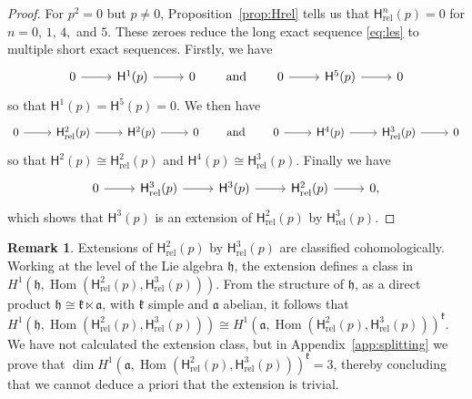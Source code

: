 \documentclass[11pt,reqno,a4paper,final]{amsart}
\theoremstyle{plain}
\theoremstyle{definition}
\newtheorem*{remark}{Remark}
\newcommand{\h}{\mathfrak{h}}
\newcommand{\fa}{\mathfrak{a}}
\newcommand{\fk}{\mathfrak{k}}
\newcommand{\sH}{\mathsf{H}}
\newcommand{\Hrel}{\mathsf{H}_{\mathrm{rel}}}
\newcommand{\1}{\mathbb{1}}
\newcommand{\Hom}{\operatorname{Hom}}
\numberwithin{equation}{section}
\begin{document}
\begin{proof}
  For $p^2 = 0$ but $p \neq 0$, Proposition~\ref{prop:Hrel} tells us
  that $\Hrel^n(p) = 0$ for $n = 0,\,1,\,4,$ and $5$. These zeroes
  reduce the long exact sequence \eqref{eq:les} to multiple short
  exact sequences. Firstly, we have
  \begin{equation}
    \begin{tikzcd}
      0 \arrow[r] & \sH^1(p) \arrow[r] & 0
    \end{tikzcd}
    \qquad\text{and}\qquad
    \begin{tikzcd}
      0 \arrow[r] & \sH^5(p) \arrow[r] & 0
    \end{tikzcd}
  \end{equation}
  so that $\sH^1(p) = \sH^5(p) = 0$.  We then have
  \begin{equation}
    \begin{tikzcd}
      0 \arrow[r] & \Hrel^2(p) \arrow[r] & \sH^2(p) \arrow[r] & 0 
    \end{tikzcd}
    \qquad\text{and}\qquad
    \begin{tikzcd}
      0 \arrow[r] & \sH^4(p) \arrow[r] & \Hrel^3(p) \arrow[r] & 0 
    \end{tikzcd}
  \end{equation}
  so that $\sH^2(p) \cong \Hrel^2(p)$  and $\sH^4(p) \cong \Hrel^3(p)$.
  Finally we have
  \begin{equation} \label{eq:Hrel3-H3-Hrel2-SES}
    \begin{tikzcd}
      0 \arrow[r] & \Hrel^3(p) \arrow[r] & \sH^3(p) \arrow[r] &
      \Hrel^2(p) \arrow[r] & 0,
    \end{tikzcd}
  \end{equation}
  which shows that $\sH^3(p)$ is an extension of $\Hrel^2(p)$ by
  $\Hrel^3(p)$.
\end{proof}

\begin{remark}
  Extensions of $\Hrel^2(p)$ by $\Hrel^3(p)$ are classified
  cohomologically.  Working at the level of the Lie algebra $\h$, the
  extension defines a class in $H^1(\h,\Hom(\Hrel^2(p), \Hrel^3(p)))$.
  From the structure of $\h$, as a direct product
  $\h \cong \fk \ltimes \fa$, with $\fk$ simple and
  $\fa$ abelian, it follows that $H^1(\h,\Hom(\Hrel^2(p), \Hrel^3(p)))
  \cong H^1(\fa,\Hom(\Hrel^2(p), \Hrel^3(p)))^\fk$.  We have not
  calculated the extension class, but in Appendix~\ref{app:splitting}
  we prove that $\dim H^1(\fa,\Hom(\Hrel^2(p), \Hrel^3(p)))^\fk = 3$,
  thereby concluding that we cannot deduce a priori that the extension
  is trivial.
\end{remark}
\end{document}
